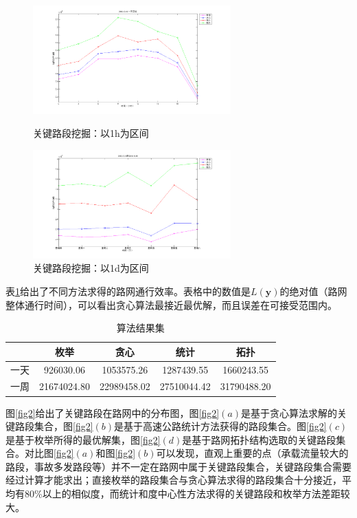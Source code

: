 				\begin{figure}[h]
				\begin{minipage}{0.5\linewidth}
					\centering
					\includegraphics[width=3.0in]{picture/one_day_5}
					\caption{关键路段挖掘：以1h为区间}
					\label{fig1:a}
				\end{minipage}%
				\begin{minipage}{0.5\linewidth}
					\centering
					\includegraphics[width=3.0in]{picture/one_week_5}
					\caption{关键路段挖掘：以1d为区间}
					\label{fig1:b}
				\end{minipage}
				\end{figure}

				表\ref{tab:5}给出了不同方法求得的路网通行效率。表格中的数值是$L(\bm{y})$的绝对值（路网整体通行时间），可以看出贪心算法最接近最优解，而且误差在可接受范围内。

				\begin{table}[h]
				\centering
				\begin{tabular}{|c|c|c|c|c|}
				\hline
				\hline
				   &   枚举 &   贪心 &   统计 &   拓扑 \\
				\hline
				  一天 &  926030.06 & 1053575.26 & 1287439.55 & 1660243.55 \\
				\hline
				  一周 &  21674024.80 & 22989458.02 & 27510044.42 & 31790488.20 \\
				\hline
				\end{tabular}
				\caption{算法结果集}
				\label{tab:5}
				\end{table} 



				图\ref{fig2}给出了关键路段在路网中的分布图，图\ref{fig2}$(a)$是基于贪心算法求解的关键路段集合，图\ref{fig2}$(b)$是基于高速公路统计方法获得的路段集合。图\ref{fig2}$(c)$是基于枚举所得的最优解集，图\ref{fig2}$(d)$是基于路网拓扑结构选取的关键路段集合。对比图\ref{fig2}$(a)$和图\ref{fig2}$(b)$可以发现，直观上重要的点（承载流量较大的路段，事故多发路段等）并不一定在路网中属于关键路段集合，关键路段集合需要经过计算才能求出；直接枚举的路段集合与贪心算法求得的路段集合十分接近，平均有80\%以上的相似度，而统计和度中心性方法求得的关键路段和枚举方法差距较大。


